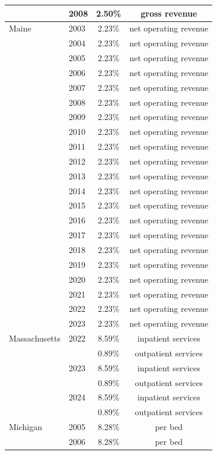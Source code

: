 \begin{longtable}{llcc}
 & 2008 & 2.50\% & gross revenue \\[0pt]
\midrule
Maine & 2003 & 2.23\% & net operating revenue \\[0pt]
 & 2004 & 2.23\% & net operating revenue \\[0pt]
 & 2005 & 2.23\% & net operating revenue \\[0pt]
 & 2006 & 2.23\% & net operating revenue \\[0pt]
 & 2007 & 2.23\% & net operating revenue \\[0pt]
 & 2008 & 2.23\% & net operating revenue \\[0pt]
 & 2009 & 2.23\% & net operating revenue \\[0pt]
 & 2010 & 2.23\% & net operating revenue \\[0pt]
 & 2011 & 2.23\% & net operating revenue \\[0pt]
 & 2012 & 2.23\% & net operating revenue \\[0pt]
 & 2013 & 2.23\% & net operating revenue \\[0pt]
 & 2014 & 2.23\% & net operating revenue \\[0pt]
 & 2015 & 2.23\% & net operating revenue \\[0pt]
 & 2016 & 2.23\% & net operating revenue \\[0pt]
 & 2017 & 2.23\% & net operating revenue \\[0pt]
 & 2018 & 2.23\% & net operating revenue \\[0pt]
 & 2019 & 2.23\% & net operating revenue \\[0pt]
 & 2020 & 2.23\% & net operating revenue \\[0pt]
 & 2021 & 2.23\% & net operating revenue \\[0pt]
 & 2022 & 2.23\% & net operating revenue \\[0pt]
 & 2023 & 2.23\% & net operating revenue \\[0pt]
\midrule
Massachusetts & 2022 & 8.59\% & inpatient services \\[0pt]
 &  & 0.89\% & outpatient services \\[0pt]
 & 2023 & 8.59\% & inpatient services \\[0pt]
 &  & 0.89\% & outpatient services \\[0pt]
 & 2024 & 8.59\% & inpatient services \\[0pt]
 &  & 0.89\% & outpatient services \\[0pt]
\midrule
Michigan & 2005 & 8.28\% & per bed \\[0pt]
 & 2006 & 8.28\% & per bed \\[0pt]

\end{longtable}
